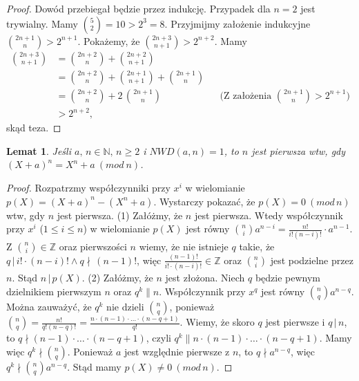 \documentclass[declaration,shortabstract]{iithesis}
\theoremstyle{definition}
\theoremstyle{remark} \newtheorem{observation}{Obserwacja}
\theoremstyle{plain} \newtheorem{theorem}{Twierdzenie}
\theoremstyle{plain} \newtheorem{lemma}{Lemat}
\theoremstyle{remark} \newtheorem*{remark*}{Uwaga}
\theoremstyle{reminder} \newtheorem*{reminder*}{Przypomnienie}
\begin{document}
\begin{proof}
	Dowód przebiegał będzie przez indukcję. Przypadek dla $n = 2$ jest trywialny. Mamy ${5 \choose 2} = 10 > 2^3 = 8.$\newline
	Przyjmijmy założenie indukcyjne ${2n + 1 \choose n} > 2^{n+1}$. Pokażemy, że ${2n + 3 \choose n + 1} > 2^{n+2}$. Mamy
	\begin{align*}
		{2n + 3 \choose n + 1} &= {2n + 2 \choose n} + {2n + 2 \choose n + 1} \\
		&= {2n + 2 \choose n} + {2n + 1 \choose n + 1} + {2n + 1 \choose n} \\
		  & = {2n + 2 \choose n} + 2\, {2n + 1 \choose n} &   & \text{(Z założenia ${2n + 1 \choose n} > 2^{n+1}$)} \\
		&> 2^{n+2},
	\end{align*}
	skąd teza.
\end{proof}
	
\begin{lemma}\label{L1}
	Jeśli $a, \, n \in \mathbb{N}, \, n \geq 2$ i $NWD(a, n) = 1$, to $n$ jest pierwsza wtw, gdy $(X + a)^n = X^n + a \: (mod \: n)$.
\end{lemma}
	
\begin{proof}
	Rozpatrzmy współczynniki przy $x^i$ w wielomianie $p(X) = (X + a)^n - (X^n + a)$. Wystarczy pokazać, że $p(X) = 0 \: (mod \, n)$ wtw, gdy $n$ jest pierwsza.\newline
	(1) Załóżmy, że $n$ jest pierwsza. Wtedy współczynnik przy $x^i$ ($1 \leq i \leq n$) w wielomianie $p(X)$ jest równy ${n \choose i}a^{n-i} = \frac{n!}{i!(n-i)!} \cdot a^{n-1}$. Z ${n \choose i} \in \mathbb{Z}$ oraz pierwszości $n$ wiemy, że nie istnieje $q$ takie, że $q \, | \, i! \cdot (n-i)! \wedge q \nmid \, (n - 1)!$, więc $\frac{(n - 1)!}{i! \cdot (n - i)!} \in \mathbb{Z}$ oraz ${n \choose i}$ jest podzielne przez $n$. Stąd $n \, | \, p(X)$. \newline
	(2) Załóżmy, że $n$ jest złożona. Niech $q$ będzie pewnym dzielnikiem pierwszym $n$ oraz $q^k \parallel n$. Współczynnik przy $x^q$ jest równy ${n \choose q}a^{n-q}$. Można zauważyć, że $q^k$ nie dzieli ${n \choose q}$, ponieważ ${n \choose q} = \frac{n!}{q!(n-q)!} = \frac{n \cdot (n-1) \cdot \dots \cdot (n - q + 1)}{q!}$. Wiemy, że skoro $q$ jest pierwsze i $q \,| \, n$, to $q \nmid (n-1) \cdot \dots \cdot (n - q + 1)$, czyli $q^k \parallel n \cdot (n-1) \cdot \dots \cdot (n - q + 1)$. Mamy więc $q^k \nmid {n \choose q}$. Ponieważ $a$ jest względnie pierwsze z $n$, to $q \nmid a^{n-q}$, więc $q^k \nmid {n \choose q}a^{n-q}$. Stąd mamy $p(X) \neq 0 \: (mod \, n)$.
\end{proof}
	
\end{document}
